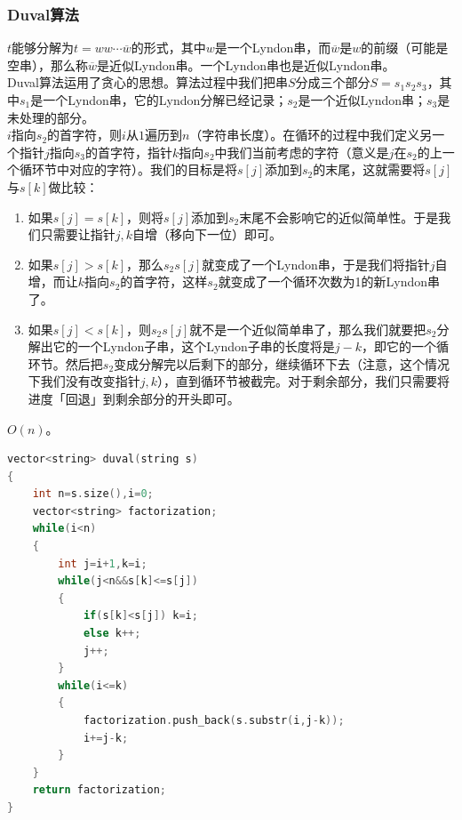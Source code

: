 \documentclass[a4paper]{book}
\begin{document}
\subsubsection{Duval算法}
$t$能够分解为$t=ww\cdots\overline{w}$的形式，其中$w$是一个Lyndon串，而$\overline{w}$是$w$的前缀（可能是空串），那么称$\overline{w}$是近似Lyndon串。一个Lyndon串也是近似Lyndon串。\\
\indent Duval算法运用了贪心的思想。算法过程中我们把串$S$分成三个部分$S=s_1s_2s_3$，其中$s_1$是一个Lyndon串，它的Lyndon分解已经记录；$s_2$是一个近似Lyndon串；$s_3$是未处理的部分。\\
$i$指向$s_2$的首字符，则$i$从$1$遍历到$n$（字符串长度）。在循环的过程中我们定义另一个指针$j$指向$s_3$的首字符，指针$k$指向$s_2$中我们当前考虑的字符（意义是$j$在$s_2$的上一个循环节中对应的字符）。我们的目标是将$s[j]$添加到$s_2$的末尾，这就需要将$s[j]$与$s[k]$做比较：
\begin{enumerate}
    \item 如果$s[j]=s[k]$，则将$s[j]$添加到$s_2$末尾不会影响它的近似简单性。于是我们只需要让指针$j,k$自增（移向下一位）即可。
    \item 如果$s[j]>s[k]$，那么$s_2s[j]$就变成了一个Lyndon串，于是我们将指针$j$自增，而让$k$指向$s_2$的首字符，这样$s_2$就变成了一个循环次数为1的新Lyndon串了。
    \item 如果$s[j]<s[k]$，则$s_2s[j]$就不是一个近似简单串了，那么我们就要把$s_2$分解出它的一个Lyndon子串，这个Lyndon子串的长度将是$j-k$，即它的一个循环节。然后把$s_2$变成分解完以后剩下的部分，继续循环下去（注意，这个情况下我们没有改变指针$j,k$），直到循环节被截完。对于剩余部分，我们只需要将进度「回退」到剩余部分的开头即可。
\end{enumerate}
$O(n)$。
\begin{lstlisting}[language=c++]
vector<string> duval(string s) 
{
    int n=s.size(),i=0;
    vector<string> factorization;
    while(i<n) 
    {
        int j=i+1,k=i;
        while(j<n&&s[k]<=s[j]) 
        {
            if(s[k]<s[j]) k=i;
            else k++;
            j++;
        }
        while(i<=k) 
        {
            factorization.push_back(s.substr(i,j-k));
            i+=j-k;
        }
    }
    return factorization;
}
\end{lstlisting}
\ifx\allfiles\undefined
\end{document}
